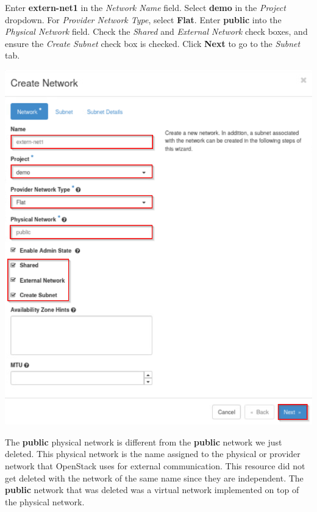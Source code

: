 \documentclass[letterpaper, 12pt]{article}
\begin{document}
\begin{enumerate}
    \begin{labstep}
        Enter \textbf{extern-net1} in the \textit{Network Name} field.
        Select \textbf{demo} in the \textit{Project} dropdown.
        For \textit{Provider Network Type}, select \textbf{Flat}.
        Enter \textbf{public} into the \textit{Physical Network} field.
        Check the \textit{Shared} and \textit{External Network} check boxes, and ensure the \textit{Create Subnet} check box is checked.
        Click \textbf{Next} to go to the \textit{Subnet} tab.

        \begin{center}
            \includegraphics[width=\linewidth]{images/part1/step7.png}
        \end{center}
    \end{labstep}

    \begin{notebox}
        The \textbf{public} physical network is different from the \textbf{public} network we just deleted.
        This physical network is the name assigned to the physical or provider network that OpenStack uses for external communication.
        This resource did not get deleted with the network of the same name since they are independent.
        The \textbf{public} network that was deleted was a virtual network implemented on top of the physical network.
    \end{notebox}


\end{enumerate}
\end{document}
